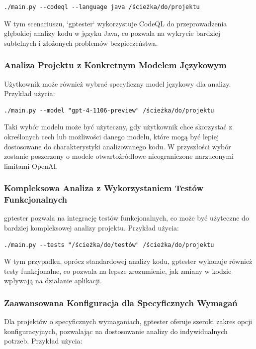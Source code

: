 \begin{verbatim}
./main.py --codeql --language java /ścieżka/do/projektu
\end{verbatim}

W tym scenariuszu, `gptester` wykorzystuje CodeQL do przeprowadzenia głębokiej analizy kodu w języku Java, co pozwala na wykrycie bardziej subtelnych i złożonych problemów bezpieczeństwa.

\subsubsection{Analiza Projektu z Konkretnym Modelem Językowym}
Użytkownik może również wybrać specyficzny model językowy dla analizy. Przykład użycia:

\begin{verbatim}
./main.py --model "gpt-4-1106-preview" /ścieżka/do/projektu
\end{verbatim}

Taki wybór modelu może być użyteczny, gdy użytkownik chce skorzystać z określonych cech lub możliwości danego modelu, które mogą być lepiej dostosowane do charakterystyki analizowanego kodu. 
W przyszłości wybór zostanie poszerzony o modele otwartoźródłowe nieograniczone narzuconymi limitami OpenAI.

\subsubsection{Kompleksowa Analiza z Wykorzystaniem Testów Funkcjonalnych}
gptester pozwala na integrację testów funkcjonalnych, co może być użyteczne do bardziej kompleksowej analizy projektu. Przykład użycia:

\begin{verbatim}
./main.py --tests "/ścieżka/do/testów" /ścieżka/do/projektu
\end{verbatim}

W tym przypadku, oprócz standardowej analizy kodu, gptester wykonuje również testy funkcjonalne, co pozwala na lepsze zrozumienie, jak zmiany w kodzie wpływają na działanie aplikacji.

\subsubsection{Zaawansowana Konfiguracja dla Specyficznych Wymagań}
Dla projektów o specyficznych wymaganiach, gptester oferuje szeroki zakres opcji konfiguracyjnych, pozwalając na dostosowanie analizy do indywidualnych potrzeb. Przykład użycia:

